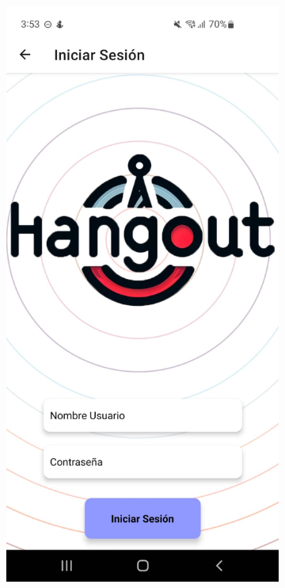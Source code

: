 \clearpage
\vspace*{\fill}
\begin{figure}[H]
    \centering
    \begin{subfigure}{0.45\textwidth}
        \centering
        \includegraphics[width=\linewidth]{imagenes/Capturas/InicioSesion.jpeg}

\end{subfigure}
\end{figure}
